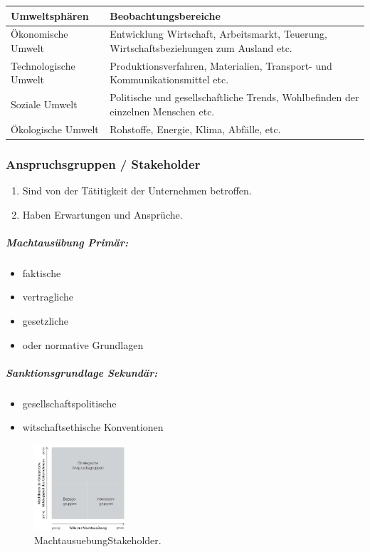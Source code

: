 \documentclass{article}
\begin{document}
\begin{tabular}{|l|l|}
\hline 
\rule[-1ex]{0pt}{2.5ex} \textbf{Umweltsphären} & \textbf{Beobachtungsbereiche} \\ 
\hline 
\rule[-1ex]{0pt}{2.5ex} Ökonomische Umwelt & Entwicklung Wirtschaft, Arbeitsmarkt, Teuerung, Wirtschaftsbeziehungen zum Ausland etc. \\ 
\hline 
\rule[-1ex]{0pt}{2.5ex} Technologische Umwelt & Produktionsverfahren, Materialien, Transport- und Kommunikationsmittel etc. \\ 
\hline 
\rule[-1ex]{0pt}{2.5ex} Soziale Umwelt & Politische und gesellschaftliche Trends, Wohlbefinden der einzelnen Menschen etc. \\ 
\hline 
\rule[-1ex]{0pt}{2.5ex} Ökologische Umwelt & Rohstoffe, Energie, Klima, Abfälle, etc. \\ 
\hline 
\end{tabular} 


\subsubsection{Anspruchsgruppen / Stakeholder}
\begin{enumerate}
\item Sind von der Tätitigkeit der Unternehmen betroffen. 
\item Haben Erwartungen und Ansprüche.
\end{enumerate}
 

\subparagraph{Machtausübung Primär:}
\begin{itemize}
\item faktische
\item vertragliche
\item gesetzliche
\item oder normative Grundlagen
\end{itemize}


\subparagraph{Sanktionsgrundlage Sekundär:}
\begin{itemize}
\item gesellschaftspolitische
\item witschaftsethische Konventionen
\end{itemize}

\begin{figure}[H]
\centering
\includegraphics[width=0.3\textwidth]{Resources/Image/MachtausuebungStakeholder.png}
\caption{\label{fig:MachtausuebungStakeholder}MachtausuebungStakeholder.}
\end{figure}
\end{document}
